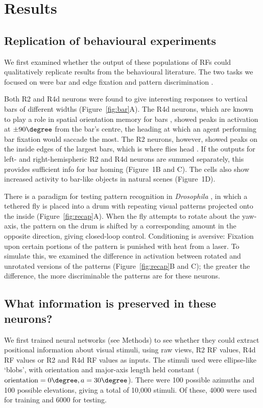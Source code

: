 \section*{Results}

\subsection*{Replication of behavioural experiments}
We first examined whether the output of these populations of \acp{RF} could qualitatively replicate results from the behavioural literature.
The two tasks we focused on were bar and edge fixation \cite{Neuser2008,Osorio1990} and pattern discrimination \cite{Pan2009,Liu2006,Ernst1999}.

Both R2 and R4d neurons were found to give interesting responses to vertical bars of different widths (Figure~\ref{fig:bar}A).
The R4d neurons, which are known to play a role in spatial orientation memory for bars \cite{Neuser2008}, showed peaks in activation at $\pm 90\degree$ from the bar's centre, the heading at which an agent performing bar fixation would saccade the most.
The R2 neurons, however, showed peaks on the inside edges of the largest bars, which is where flies head \cite{Osorio1990}.
If the outputs for left- and right-hemispheric R2 and R4d neurons are summed separately, this provides sufficient info for bar homing (Figure~1B and C).
The cells also show increased activity to bar-like objects in natural scenes (Figure~1D).

There is a paradigm for testing pattern recognition in \emph{Drosophila} \cite{Pan2009,Liu2006,Ernst1999}, in which a tethered fly is placed into a drum with repeating visual patterns projected onto the inside (Figure~\ref{fig:recap}A).
When the fly attempts to rotate about the yaw-axis, the pattern on the drum is shifted by a corresponding amount in the opposite direction, giving closed-loop control.
Conditioning is aversive: Fixation upon certain portions of the pattern is punished with heat from a laser.
To simulate this, we examined the difference in activation between rotated and unrotated versions of the patterns (Figure~\ref{fig:recap}B and C); the greater the difference, the more discriminable the patterns are for these neurons.

\subsection*{What information is preserved in these neurons?}

We first trained neural networks (see Methods) to see whether they could extract positional information about visual stimuli, using raw views, R2 \ac{RF} values, R4d \ac{RF} values or R2 and R4d \ac{RF} values as inputs.
The stimuli used were ellipse-like `blobs', with orientation and major-axis length held constant ($\mathrm{orientation} = 0\degree, a = 30\degree$).
There were 100 possible azimuths and 100 possible elevations, giving a total of 10,000 stimuli.
Of these, 4000 were used for training and 6000 for testing.

